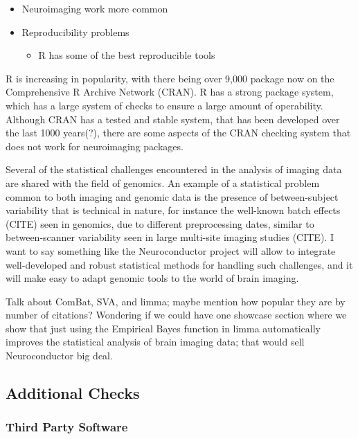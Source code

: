 \documentclass[]{elsarticle} %
\providecommand{\tightlist}{%
  \setlength{\itemsep}{0pt}\setlength{\parskip}{0pt}}
\newcommand{\fixme}[1]{{\color{red} #1}}
\newcommand{\fixme}[1]{{\color{red} #1}}
\begin{document}
\begin{itemize}
\tightlist
\item
  Neuroimaging work more common
\item
  Reproducibility problems

  \begin{itemize}
  \tightlist
  \item
    R has some of the best reproducible tools
  \end{itemize}
\end{itemize}

R is increasing in popularity, with there being over 9,000 package now
on the Comprehensive R Archive Network (CRAN). R has a strong package
system, which has a large system of checks to ensure a large amount of
operability. Although CRAN has a tested and stable system, that has been
developed over the last 1000 years(?), there are some aspects of the
CRAN checking system that does not work for neuroimaging packages.

\fixme{Several of the statistical challenges encountered in the analysis of imaging data are shared with the field of genomics. An example of a statistical problem common to both imaging and genomic data is the presence of between-subject variability that is technical in nature, for instance the well-known batch effects (CITE) seen in genomics, due to different preprocessing dates, similar to between-scanner variability seen in large multi-site imaging studies (CITE). I want to say something like the Neuroconductor project will allow to integrate well-developed and robust statistical methods for handling such challenges, and it will make easy to adapt genomic tools to the world of brain imaging.

Talk about ComBat, SVA, and limma; maybe mention how popular they are by number of citations? Wondering if we could have one showcase section where we show that just using the Empirical Bayes function in limma automatically improves the statistical analysis of brain imaging data; that would sell Neuroconductor big deal. }




\subsection{Additional Checks}\label{additional-checks}

\subsubsection{Third Party Software}\label{third-party-software}
\end{document}
